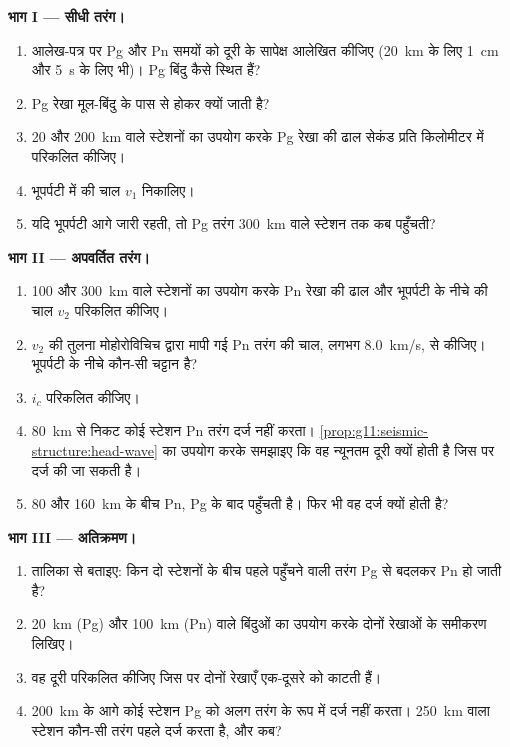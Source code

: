 \begin{problem}
\medskip
\noindent\textbf{भाग I --- सीधी तरंग।}
\begin{enumerate}
  \item आलेख-पत्र पर Pg और Pn समयों को दूरी के सापेक्ष आलेखित कीजिए (\qty{20}{km} के लिए
        \qty{1}{cm} और \qty{5}{s} के लिए भी)। Pg बिंदु कैसे स्थित हैं?
  \item Pg रेखा मूल-बिंदु के पास से होकर क्यों जाती है?
  \item 20 और \qty{200}{km} वाले स्टेशनों का उपयोग करके Pg रेखा की ढाल
        सेकंड प्रति किलोमीटर में परिकलित कीजिए।
  \item भूपर्पटी में  की चाल $v_1$ निकालिए।
  \item यदि भूपर्पटी आगे जारी रहती, तो Pg तरंग \qty{300}{km} वाले स्टेशन तक
        कब पहुँचती?
\end{enumerate}

\medskip
\noindent\textbf{भाग II --- अपवर्तित तरंग।}
\begin{enumerate}[resume]
  \item 100 और \qty{300}{km} वाले स्टेशनों का उपयोग करके
        Pn रेखा की ढाल और भूपर्पटी के नीचे  की चाल $v_2$ परिकलित कीजिए।
  \item $v_2$ की तुलना मोहोरोविचिच द्वारा मापी गई Pn तरंग की चाल,
        लगभग \qty{8.0}{km/s}, से कीजिए। भूपर्पटी के नीचे कौन-सी चट्टान है?
  \item {} $i_c$ परिकलित कीजिए।
  \item \qty{80}{km} से निकट कोई स्टेशन Pn तरंग दर्ज नहीं करता।
        \cref{prop:g11:seismic-structure:head-wave} का उपयोग करके समझाइए कि
        वह न्यूनतम दूरी क्यों होती है जिस पर  दर्ज की जा सकती है।
  \item 80 और \qty{160}{km} के बीच Pn, Pg के बाद पहुँचती है। फिर भी वह
        दर्ज क्यों होती है?
\end{enumerate}

\medskip
\noindent\textbf{भाग III --- अतिक्रमण।}
\begin{enumerate}[resume]
  \item तालिका से बताइए: किन दो स्टेशनों के बीच पहले
        पहुँचने वाली तरंग Pg से बदलकर Pn हो जाती है?
  \item \qty{20}{km} (Pg) और \qty{100}{km} (Pn) वाले बिंदुओं का उपयोग करके
        दोनों रेखाओं के समीकरण लिखिए।
  \item वह दूरी परिकलित कीजिए जिस पर दोनों रेखाएँ एक-दूसरे को काटती हैं।
  \item \qty{200}{km} के आगे कोई स्टेशन Pg को अलग तरंग के रूप में दर्ज नहीं करता।
        \qty{250}{km} वाला स्टेशन कौन-सी तरंग पहले दर्ज करता है, और कब?
\end{enumerate}


\end{problem}

